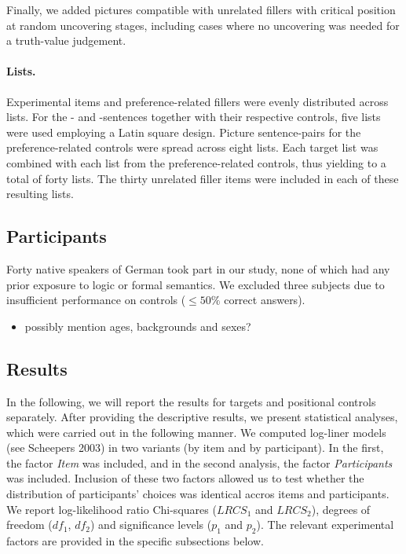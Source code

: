 \documentclass[fleqn,reqno,10pt,draft]{article}
\newcommand{\as}{\acro{as}}
\renewcommand{\es}{\acro{es}}
\begin{document}
Finally, we added pictures compatible with unrelated fillers with
critical position at random uncovering stages, including cases where
no uncovering was needed for a truth-value judgement.

\paragraph{Lists.}
Experimental items and preference-related fillers were evenly
distributed across lists. For the \as- and \es-sentences together with
their respective controls, five lists were used employing a Latin
square design. Picture sentence-pairs for the preference-related
controls were spread across eight lists. Each target list was combined
with each list from the preference-related controls, thus yielding to
a total of forty lists. The thirty unrelated filler items were
included in each of these resulting lists.


\subsection{Participants}
\label{sec:participants} 

Forty native speakers of German took part in our study, none of which had
any prior exposure to logic or formal semantics. We excluded three
subjects due to insufficient performance on controls ($\le 50\%$
correct answers). 

\begin{itemize}
\item possibly mention ages, backgrounds and sexes?
\end{itemize}


\subsection{Results}
\label{sec:results}

In the following, we will report the results for targets and positional
controls separately. After providing the descriptive results, we present
statistical analyses, which were carried out in the following manner.
We computed log-liner models (see Scheepers 2003) in two variants (by 
item and by participant). In the first, the factor {\it Item} was 
included, and in the second analysis, the factor {\it Participants} 
was included. Inclusion of these two factors allowed us to test whether 
the distribution of participants' choices was identical accros items and 
participants. We report log-likelihood ratio Chi-squares ($LRCS_1$ 
and $LRCS_2$), degrees of freedom ($df_1$, $df_2$) and significance 
levels ($p_1$ and $p_2$). The relevant experimental
factors are provided in the specific subsections below.
\end{document}
